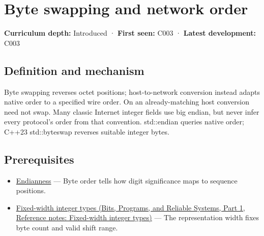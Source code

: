 \hypertarget{appendix-11ba36693aa2}{}\label{referencestart:appendix-11ba36693aa2}
\section{Byte swapping and network order}\label{appendix-11ba36693aa2-byte-swapping-and-network-order}

\hypertarget{appendix-11ba36693aa2-byte-swapping-and-network-order}{}

\textbf{Curriculum depth:} Introduced · \textbf{First seen:} C003 · \textbf{Latest development:} C003

\begin{allmightroledefinition}

\subsection{Definition and mechanism}\label{appendix-11ba36693aa2-definition-and-mechanism}

\hypertarget{appendix-11ba36693aa2-definition-and-mechanism}{}

Byte swapping reverses octet positions; host-to-network conversion instead adapts native order to a specified wire order. On an already-matching host conversion need not swap. Many classic Internet integer fields use big endian, but never infer every protocol's order from that convention. std::endian queries native order; C++23 std::byteswap reverses suitable integer bytes.

\end{allmightroledefinition}

\subsection{Prerequisites}\label{appendix-11ba36693aa2-prerequisites}

\hypertarget{appendix-11ba36693aa2-prerequisites}{}

\begin{itemize}
\tightlist
\item
  \hyperref[appendix-bc07c3d25b18]{Endianness} --- Byte order tells how digit significance maps to sequence positions.
\item
  \href{../01-Bits-Programs-and-Reliable-Systems-P01/main.pdf\#appendix-cc04044b5782}{Fixed-width integer types (Bits, Programs, and Reliable Systems, Part 1, Reference notes: Fixed-width integer types)} --- The representation width fixes byte count and valid shift range.
\end{itemize}

